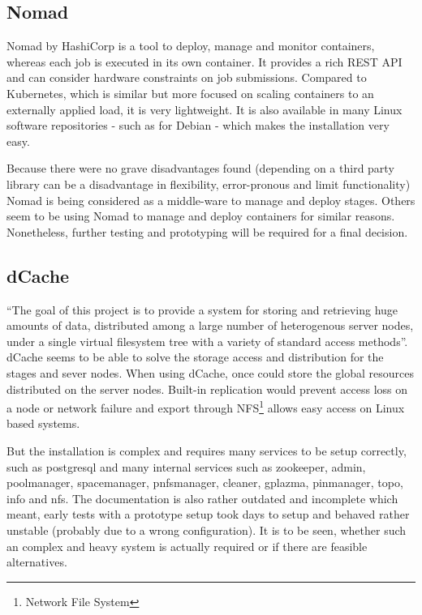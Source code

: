 \subsection{Nomad}

Nomad\cite{nomad:main} by HashiCorp is a tool to deploy, manage and monitor containers, whereas each job is executed in its own container.
It provides a rich REST API and can consider hardware constraints on job submissions.
Compared to Kubernetes\cite{nomad:vs:kubernetes}, which is similar but more focused on scaling containers to an externally applied load, it is very lightweight.
It is also available in many Linux software repositories - such as for Debian - which makes the installation very easy.

Because there were no grave disadvantages found (depending on a third party library can be a disadvantage in flexibility, error-pronous and limit functionality) Nomad is being considered as a middle-ware to manage and deploy stages.
Others\cite{nomad:etc:gui_thesis} seem to be using Nomad to manage and deploy containers for similar reasons.
Nonetheless, further testing and prototyping will be required for a final decision.


\subsection{dCache}

\enquote{The goal of this project is to provide a system for storing and retrieving huge amounts of data, distributed among a large number of heterogenous server nodes, under a single virtual filesystem tree with a variety of standard access methods}\cite{dcache:main}.
dCache seems to be able to solve the storage access and distribution for the stages and sever nodes.
When using dCache, once could store the global resources distributed on the server nodes.
Built-in replication would prevent access loss on a node or network failure and export through NFS\footnote{Network File System} allows easy access on Linux based systems\cite{dcache:overview:whitepaper}.

But the installation is complex and requires many services to be setup correctly, such as postgresql and many internal services such as zookeeper, admin, poolmanager, spacemanager, pnfsmanager, cleaner, gplazma, pinmanager, topo, info and nfs.
The documentation is also rather outdated and incomplete which meant, early tests with a prototype setup took days to setup and behaved rather unstable (probably due to a wrong configuration).
It is to be seen, whether such an complex and heavy system is actually required or if there are feasible alternatives.




